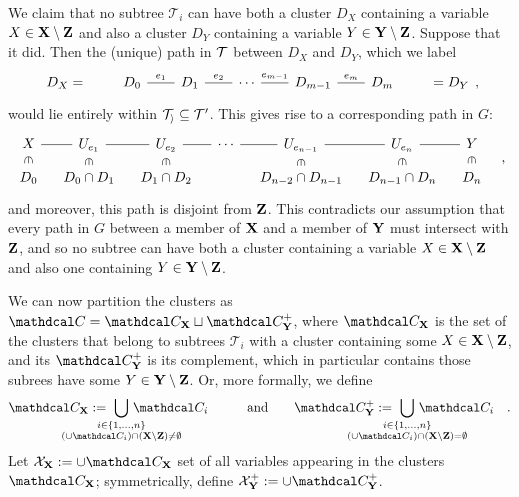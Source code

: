 \begin{lproof}
    We claim that no subtree $\mathcal T_i$ can have both a cluster $D_X$ containing a variable $X \in \mathbf{X} \setminus \mathbf{Z}$ and also a cluster $D_Y$ containing a variable $Y \in \mathbf{Y} \setminus \mathbf{Z}$.
    Suppose that it did. 
    Then the (unique) path in $\cal T$ between $D_X$ and $D_Y$, which we label
    \[
    \begin{tikzcd}[column sep=2em]
        D_X=
        &D_0 \ar[r,-,"e_1"]&
        D_1 \ar[r,-,"e_2"]&
          \cdots
        \ar[r,-,"e_{m-1}"]& D_{m-1}
        \ar[r,-,"e_m"] & D_m&
        =D_Y
    \end{tikzcd},
    \]
    would lie entirely within $\cal T_i \subseteq \mathcal T'$. This gives rise to 
    a corresponding path in $G$:
    \[\begin{tikzcd}[column sep=1em,row sep=1.5ex]
        X \ar[r,-] \ar[d,sloped,phantom,"\in"]
        & U_{e_1}\ar[r,-] \ar[d,sloped,phantom,"\in"]
        & U_{e_2}\ar[r,-] \ar[d,sloped,phantom,"\in"]
           &\cdots\ar[r,-]
        & U_{e_{n{-}1}} \ar[r,-] \ar[d,sloped,phantom,"\in"]
        & U_{e_n}\ar[r,-] \ar[d,sloped,phantom,"\in"]
        & Y \ar[d,sloped,phantom,"\in"]  
            \\
        D_0
        & D_0 \cap D_1
        & D_1 \cap D_2
        &
        & D_{n{-}2} \cap D_{n{-}1}
        & D_{n{-}1} \cap D_n
        & D_n
    \end{tikzcd}\quad,\]
    and moreover, this path is disjoint from $\mathbf{Z}$.
    This contradicts our assumption that every path in $G$ between a member of $\mathbf{X}$ and a member of $\mathbf{Y}$ must intersect with $\mathbf{Z}$, and so no subtree can have both a cluster containing a variable $X \in \mathbf{X} \setminus \mathbf{Z}$ and also one containing $Y \in \mathbf{Y} \setminus \mathbf{Z}$. 
    
    \def\CX{\C_{\mat X}}
    \def\CNX{\C_{\mat{Y}}^+}
    We can now partition the clusters as $\C = \CX \sqcup \CNX$, where
    $\CX$ is the set of the clusters that belong to subtrees $\mathcal T_i$ with a cluster containing some $X \in \mathbf{X} \setminus \mathbf{Z}$, and
    its $\CNX$ is its complement, which in particular contains those subrees have some $Y \in \mathbf{Y} \setminus \mathbf{Z}$.
    Or, more formally, we define
    \[
        \CX :=~ \bigcup_{\mathclap{\substack{i \in \{1,\ldots,n\}\\ (\cup\C_i) \cap (\mat X\setminus\mat Z) \ne \emptyset }}}\, \C_i
        \quad\qquad \text{and}\qquad
        \CNX :=~ \bigcup_{\mathclap{\substack{i \in \{1,\ldots,n\}\\ (\cup\C_i) \cap (\mat X\setminus\mat Z) = \emptyset }}}\, \C_i
        \quad.
    \]
    \def\XX{\X_{\mat X}}
    \def\XNX{\X_{\mat Y}^+}
    Let $\XX := \cup \CX$ set of all variables appearing in the clusters $\CX$; symmetrically, define $\XNX := \cup \CNX$.
    

\end{lproof}
